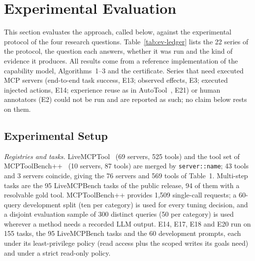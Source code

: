 \section{Experimental Evaluation}
\label{sec:ev}

This section evaluates the approach, called \pamcp{} below, against the experimental protocol of the four
research questions. Table~\ref{tab:ev-ledger} lists the 22 series of the protocol, the question each answers,
whether it was run and the kind of evidence it produces. All results come from a reference implementation of
the capability model, Algorithms~1--3 and the certificate. Series that need executed MCP servers (end-to-end
task success, E13; observed effects, E3; executed injected actions, E14; experience reuse as in AutoTool~\cite{jia2026autotool}, E21) or human
annotators (E2) could not be run and are reported as such; no claim below rests on them.



\subsection{Experimental Setup}
\label{sec:ev-setup}

\emph{Registries and tasks.} LiveMCPTool~\cite{mo2025livemcpbench} (69 servers, 525 tools) and the tool set
of MCPToolBench++~\cite{fan2025mcptoolbench} (10 servers, 87 tools) are merged by \texttt{server::name}; 43 tools
and 3 servers coincide, giving the 76 servers and 569 tools of Table~1. Multi-step tasks are the 95 LiveMCPBench
tasks of the public release, 94 of them with a resolvable gold tool. MCPToolBench++ provides 1,509 single-call
requests; a 60-query development split (ten per category) is used for every tuning decision, and a disjoint
evaluation sample of 300 distinct queries (50 per category) is used wherever a method needs a recorded LLM output.
E14, E17, E18 and E20 run on 155 tasks, the 95 LiveMCPBench tasks and the 60 development prompts, each under its
least-privilege policy (read access plus the scoped writes its goals need) and under a strict read-only policy.

